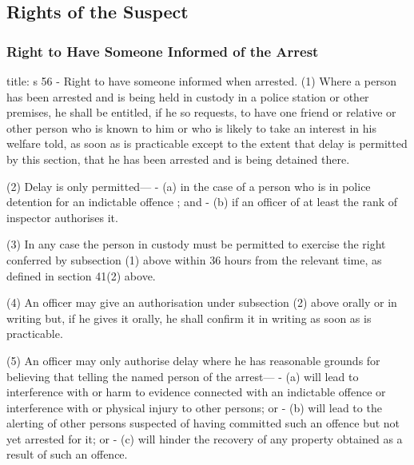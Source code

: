 \documentclass[
]{article}
\newenvironment{Shaded}{}{}
\newcommand{\NormalTok}[1]{#1}
\begin{document}
\hypertarget{rights-of-the-suspect}{%
\subsection{Rights of the Suspect}\label{rights-of-the-suspect}}

\hypertarget{right-to-have-someone-informed-of-the-arrest}{%
\subsubsection{Right to Have Someone Informed of the
Arrest}\label{right-to-have-someone-informed-of-the-arrest}}

\begin{Shaded}
\begin{Highlighting}[]
\NormalTok{title: s 56 {-} Right to have someone informed when arrested.}
\NormalTok{(1) Where a person has been arrested and is being held in custody in a police station or other premises, he shall be entitled, if he so requests, to have one friend or relative or other person who is known to him or who is likely to take an interest in his welfare told, as soon as is practicable except to the extent that delay is permitted by this section, that he has been arrested and is being detained there. }

\NormalTok{(2) Delay is only permitted—}
\NormalTok{{-} (a) in the case of a person who is in police detention for an indictable offence ; and}
\NormalTok{{-} (b) if an officer of at least the rank of inspector authorises it.}

\NormalTok{(3) In any case the person in custody must be permitted to exercise the right conferred by subsection (1) above within 36 hours from the relevant time, as defined in section 41(2) above.}

\NormalTok{(4) An officer may give an authorisation under subsection (2) above orally or in writing but, if he gives it orally, he shall confirm it in writing as soon as is practicable.}

\NormalTok{(5) An officer may only authorise delay where he has reasonable grounds for believing that telling the named person of the arrest—}
\NormalTok{{-} (a) will lead to interference with or harm to evidence connected with an indictable offence or interference with or physical injury to other persons; or}
\NormalTok{{-} (b) will lead to the alerting of other persons suspected of having committed such an offence but not yet arrested for it; or}
\NormalTok{{-} (c) will hinder the recovery of any property obtained as a result of such an offence.}
\end{Highlighting}
\end{Shaded}
\end{document}
